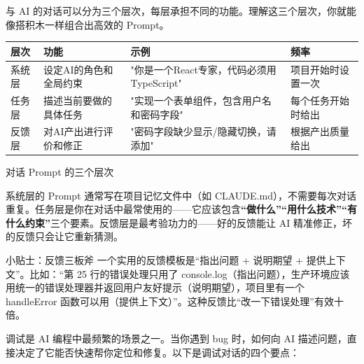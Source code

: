 


与 AI 的对话可以分为三个层次，每层承担不同的功能。理解这三个层次，你就能像搭积木一样组合出高效的 Prompt。

\begin{center}
\begin{tabularx}{\linewidth}{|X|X|X|X|}
\hline
\textbf{层次} & \textbf{功能} & \textbf{示例} & \textbf{频率} \tabularnewline
\hline
系统层 & 设定AI的角色和全局约束 & "你是一个React专家，代码必须用TypeScript" & 项目开始时设置一次 \tabularnewline
任务层 & 描述当前要做的具体任务 & "实现一个表单组件，包含用户名和密码字段" & 每个任务开始时给出 \tabularnewline
反馈层 & 对AI产出进行评价和修正 & "密码字段缺少显示/隐藏切换，请添加" & 根据产出质量给出 \tabularnewline
\hline
\end{tabularx}
\end{center}

\begin{center}\small\color{gray}对话 Prompt 的三个层次\end{center}

系统层的 Prompt 通常写在项目记忆文件中（如 CLAUDE.md），不需要每次对话重复。任务层是你在对话中最常使用的——它应该包含\textbf{“做什么”“用什么技术”“有什么约束”}三个要素。反馈层是最考验功力的——好的反馈能让 AI 精准修正，坏的反馈只会让它重新猜测。

\begin{tcbinfo}{小贴士：反馈三板斧}
一个实用的反馈模板是“指出问题 + 说明期望 + 提供上下文”。比如：“第 25 行的错误处理只用了 console.log（指出问题），生产环境应该用统一的错误处理器并返回用户友好提示（说明期望），项目里有一个 handleError 函数可以用（提供上下文）”。这种反馈比“改一下错误处理”有效十倍。

\end{tcbinfo}


调试是 AI 编程中最频繁的场景之一。当你遇到 bug 时，如何向 AI 描述问题，直接决定了它能否快速帮你定位和修复。以下是调试对话的四个要点：

